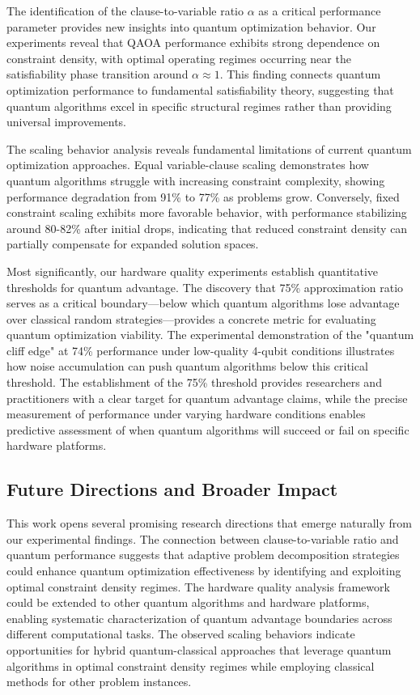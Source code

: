 \documentclass[%
 reprint,
 amsmath,amssymb,
 aps,
]{revtex4-2}
\begin{document}
The identification of the clause-to-variable ratio $\alpha$ as a critical performance parameter provides new insights into quantum optimization behavior. Our experiments reveal that QAOA performance exhibits strong dependence on constraint density, with optimal operating regimes occurring near the satisfiability phase transition around $\alpha \approx 1$. This finding connects quantum optimization performance to fundamental satisfiability theory, suggesting that quantum algorithms excel in specific structural regimes rather than providing universal improvements.

The scaling behavior analysis reveals fundamental limitations of current quantum optimization approaches. Equal variable-clause scaling demonstrates how quantum algorithms struggle with increasing constraint complexity, showing performance degradation from 91\% to 77\% as problems grow. Conversely, fixed constraint scaling exhibits more favorable behavior, with performance stabilizing around 80-82\% after initial drops, indicating that reduced constraint density can partially compensate for expanded solution spaces.

Most significantly, our hardware quality experiments establish quantitative thresholds for quantum advantage. The discovery that 75\% approximation ratio serves as a critical boundary—below which quantum algorithms lose advantage over classical random strategies—provides a concrete metric for evaluating quantum optimization viability. The experimental demonstration of the "quantum cliff edge" at 74\% performance under low-quality 4-qubit conditions illustrates how noise accumulation can push quantum algorithms below this critical threshold. The establishment of the 75\% threshold provides researchers and practitioners with a clear target for quantum advantage claims, while the precise measurement of performance under varying hardware conditions enables predictive assessment of when quantum algorithms will succeed or fail on specific hardware platforms.

\subsection{Future Directions and Broader Impact}

This work opens several promising research directions that emerge naturally from our experimental findings. The connection between clause-to-variable ratio and quantum performance suggests that adaptive problem decomposition strategies could enhance quantum optimization effectiveness by identifying and exploiting optimal constraint density regimes. The hardware quality analysis framework could be extended to other quantum algorithms and hardware platforms, enabling systematic characterization of quantum advantage boundaries across different computational tasks. The observed scaling behaviors indicate opportunities for hybrid quantum-classical approaches that leverage quantum algorithms in optimal constraint density regimes while employing classical methods for other problem instances.
\end{document}
